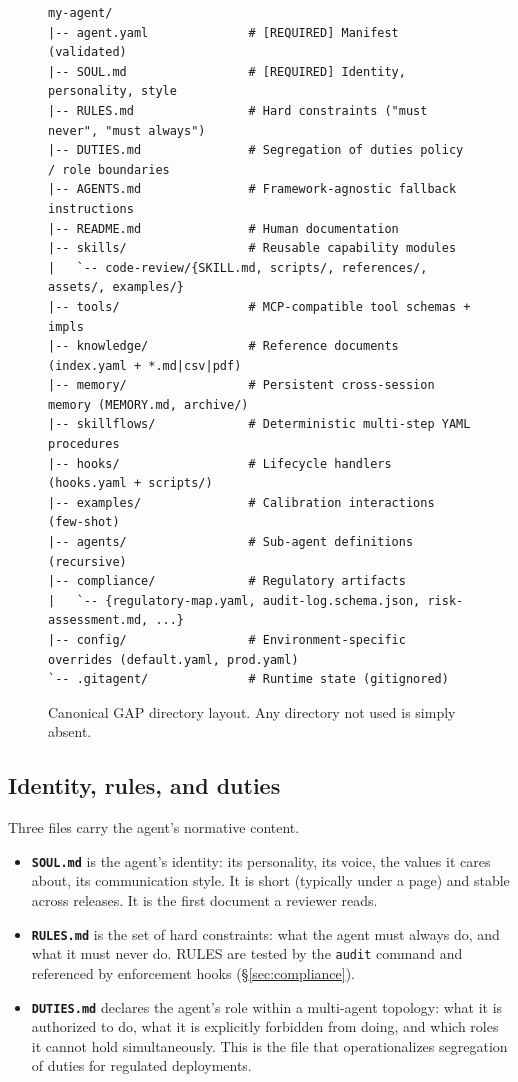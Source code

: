\documentclass[11pt,a4paper]{article}
\begin{document}
\begin{figure}[t]
\begin{lstlisting}[basicstyle=\ttfamily\scriptsize]
my-agent/
|-- agent.yaml              # [REQUIRED] Manifest (validated)
|-- SOUL.md                 # [REQUIRED] Identity, personality, style
|-- RULES.md                # Hard constraints ("must never", "must always")
|-- DUTIES.md               # Segregation of duties policy / role boundaries
|-- AGENTS.md               # Framework-agnostic fallback instructions
|-- README.md               # Human documentation
|-- skills/                 # Reusable capability modules
|   `-- code-review/{SKILL.md, scripts/, references/, assets/, examples/}
|-- tools/                  # MCP-compatible tool schemas + impls
|-- knowledge/              # Reference documents (index.yaml + *.md|csv|pdf)
|-- memory/                 # Persistent cross-session memory (MEMORY.md, archive/)
|-- skillflows/             # Deterministic multi-step YAML procedures
|-- hooks/                  # Lifecycle handlers (hooks.yaml + scripts/)
|-- examples/               # Calibration interactions (few-shot)
|-- agents/                 # Sub-agent definitions (recursive)
|-- compliance/             # Regulatory artifacts
|   `-- {regulatory-map.yaml, audit-log.schema.json, risk-assessment.md, ...}
|-- config/                 # Environment-specific overrides (default.yaml, prod.yaml)
`-- .gitagent/              # Runtime state (gitignored)
\end{lstlisting}
\caption{Canonical GAP directory layout. Any directory not used is simply absent.}
\label{fig:layout}
\end{figure}

\subsection{Identity, rules, and duties}

Three files carry the agent's normative content.

\begin{itemize}
  \item \textbf{\texttt{SOUL.md}} is the agent's identity: its personality, its voice,
  the values it cares about, its communication style. It is short (typically under a
  page) and stable across releases. It is the first document a reviewer reads.
  \item \textbf{\texttt{RULES.md}} is the set of hard constraints: what the agent must
  always do, and what it must never do. RULES are tested by the \texttt{audit}
  command and referenced by enforcement hooks (\S\ref{sec:compliance}).
  \item \textbf{\texttt{DUTIES.md}} declares the agent's role within a multi-agent
  topology: what it is authorized to do, what it is explicitly forbidden from doing,
  and which roles it cannot hold simultaneously. This is the file that operationalizes
  segregation of duties for regulated deployments.
\end{itemize}
\end{document}

